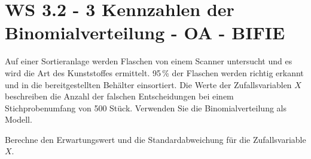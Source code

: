 \section{WS 3.2 - 3 Kennzahlen der Binomialverteilung - OA - BIFIE}

\begin{beispiel}[WS 3.2]{1} %
Auf einer Sortieranlage werden Flaschen von einem Scanner untersucht und es wird die Art
des Kunststoffes ermittelt. 95\,\% der Flaschen werden richtig erkannt und in die bereitgestellten Behälter einsortiert. Die Werte der Zufallsvariablen $X$ beschreiben die Anzahl der falschen Entscheidungen bei einem Stichprobenumfang von 500 Stück. Verwenden Sie die Binomialverteilung als Modell. \leer

Berechne den Erwartungswert und die Standardabweichung für die Zufallsvariable $X$.

\end{beispiel} 